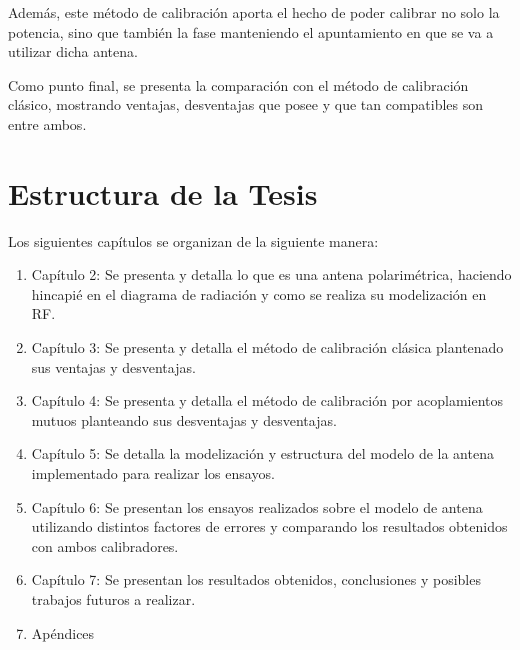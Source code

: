 Además, este método de calibración aporta el hecho de poder calibrar no solo la potencia, sino que también la fase
manteniendo el apuntamiento en que se va a utilizar dicha antena.

Como punto final, se presenta la comparación con el método de calibración clásico, mostrando ventajas, desventajas
que posee y que tan compatibles son entre ambos.


\section{Estructura de la Tesis} \label{sc:structure}

Los siguientes capítulos se organizan de la siguiente manera:

\begin{enumerate}
	\item Capítulo 2: Se presenta y detalla lo que es una antena polarimétrica, haciendo hincapié en el diagrama de radiación y como
    se realiza su modelización en RF.
	\item Capítulo 3: Se presenta y detalla el método de calibración clásica plantenado sus ventajas y desventajas.
	\item Capítulo 4: Se presenta y detalla el método de calibración por acoplamientos mutuos planteando sus desventajas y
		desventajas.
	\item Capítulo 5: Se detalla la modelización y estructura del modelo de la antena implementado para realizar los ensayos.
	\item Capítulo 6: Se presentan los ensayos realizados sobre el modelo de antena utilizando distintos factores de errores y
		comparando los resultados obtenidos con ambos calibradores.
	\item Capítulo 7: Se presentan los resultados obtenidos, conclusiones y posibles trabajos futuros a realizar.
	\item Apéndices
\end{enumerate}

